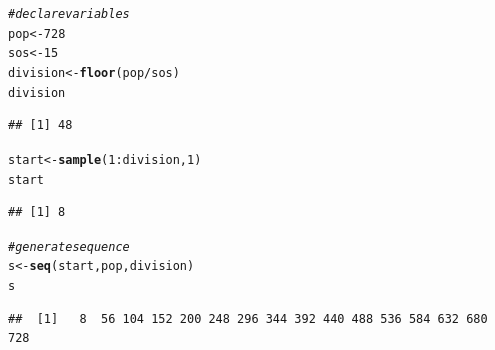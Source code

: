 \documentclass{article}\usepackage[]{graphicx}\usepackage[]{color}
\makeatletter
\newcommand{\hlnum}[1]{\textcolor[rgb]{0.686,0.059,0.569}{#1}}%
\newcommand{\hlcom}[1]{\textcolor[rgb]{0.678,0.584,0.686}{\textit{#1}}}%
\newcommand{\hlopt}[1]{\textcolor[rgb]{0,0,0}{#1}}%
\newcommand{\hlstd}[1]{\textcolor[rgb]{0.345,0.345,0.345}{#1}}%
\newcommand{\hlkwb}[1]{\textcolor[rgb]{0.69,0.353,0.396}{#1}}%
\newcommand{\hlkwd}[1]{\textcolor[rgb]{0.737,0.353,0.396}{\textbf{#1}}}%
\newenvironment{kframe}{%
 \def\at@end@of@kframe{}%
 \ifinner\ifhmode%
  \def\at@end@of@kframe{\end{minipage}}%
  \begin{minipage}{\columnwidth}%
 \fi\fi%
 \def\FrameCommand##1{\hskip\@totalleftmargin \hskip-\fboxsep
 \colorbox{shadecolor}{##1}\hskip-\fboxsep
     \hskip-\linewidth \hskip-\@totalleftmargin \hskip\columnwidth}%
 \MakeFramed {\advance\hsize-\width
   \@totalleftmargin\z@ \linewidth\hsize
   \@setminipage}}%
 {\par\unskip\endMakeFramed%
 \at@end@of@kframe}
\newenvironment{knitrout}{}{} %
\makeatother
\begin{document}
\begin{knitrout}
\color{fgcolor}\begin{kframe}
\begin{alltt}
\hlcom{#declare variables}
\hlstd{pop} \hlkwb{<-} \hlnum{728}
\hlstd{sos} \hlkwb{<-} \hlnum{15}
\hlstd{division} \hlkwb{<-} \hlkwd{floor}\hlstd{(pop} \hlopt{/} \hlstd{sos)}
\hlstd{division}
\end{alltt}
\begin{verbatim}
## [1] 48
\end{verbatim}
\begin{alltt}
\hlstd{start} \hlkwb{<-} \hlkwd{sample}\hlstd{(}\hlnum{1}\hlopt{:}\hlstd{division,} \hlnum{1}\hlstd{)}
\hlstd{start}
\end{alltt}
\begin{verbatim}
## [1] 8
\end{verbatim}
\begin{alltt}
\hlcom{#generate sequence}
\hlstd{s} \hlkwb{<-} \hlkwd{seq}\hlstd{(start, pop, division)}
\hlstd{s}
\end{alltt}
\begin{verbatim}
##  [1]   8  56 104 152 200 248 296 344 392 440 488 536 584 632 680 728
\end{verbatim}
\end{kframe}
\end{knitrout}

\subsection{}

\subsection{}

\subsection{}

\subsection{}

\subsection{}
\end{document}
